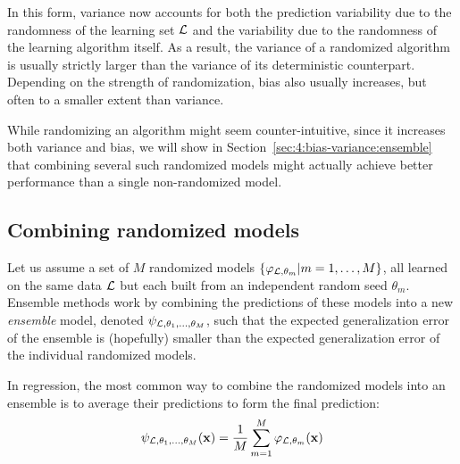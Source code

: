In this form, variance now accounts for both the prediction variability due to
the randomness of the learning set ${\cal L}$ and the variability due to the
randomness of the learning algorithm itself. As a result, the variance of a
randomized algorithm is usually strictly larger than the variance of its
deterministic counterpart. Depending on the strength of randomization, bias
also usually increases, but often to a smaller extent than variance.

While randomizing an algorithm might seem counter-intuitive, since it
increases both variance and bias, we will show in Section~\ref{sec:4:bias-variance:ensemble}
that combining several such randomized models might actually
achieve better performance than a single non-randomized model.


\subsection{Combining randomized models}

Let us assume a set of $M$ randomized models $\{\varphi_{{\cal L}, \theta_m} |
m = 1, \dots, M \}$, all learned on the same data ${\cal L}$ but each built
from an independent random seed $\theta_m$. Ensemble methods work by combining
the predictions of these models into a new \textit{ensemble} model, denoted
$\psi_{{\cal L},\theta_1,\dots,\theta_M}$, such that the expected
generalization error of the ensemble is (hopefully) smaller than the expected
generalization error of the individual randomized models.

In regression, the most common way to combine the randomized models into an
ensemble is to average their predictions to form the final prediction:
\begin{equation}
\psi_{{\cal L},\theta_1,\dots,\theta_M}(\mathbf{x}) = \frac{1}{M} \sum_{m=1}^M \varphi_{{\cal L},\theta_m}(\mathbf{x})
\end{equation}

